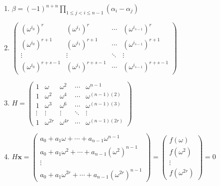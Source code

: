 \documentclass[oneside,10pt,]{article}
\newcommand{\lt}{<}
\begin{document}
\begin{enumerate}
\item{}\(\displaystyle \beta = (-1)^{n+n} \prod_{1 \leq j \lt i \leq n - 1} (\alpha_i - \alpha_j)\)%
\item{}\(\displaystyle \begin{pmatrix} (\omega^{i_0})^r & (\omega^{i_1})^r & \cdots & (\omega^{i_{s-1}})^r \\ (\omega^{i_0})^{r+1} & (\omega^{i_1})^{r+1} & \cdots & (\omega^{i_{s-1}})^{r+1} \\ \vdots & \vdots & \ddots & \vdots \\ (\omega^{i_0})^{r+s-1} & (\omega^{i_1})^{r+s-1} & \cdots & (\omega^{i_{s-1}})^{r+s-1} \end{pmatrix}\)%
\item{}\(\displaystyle H = \begin{pmatrix} 1 & \omega & \omega^2 & \cdots & \omega^{n-1}\\ 1 & \omega^2 & \omega^{4} & \cdots & \omega^{(n-1)(2)} \\ 1 & \omega^3 & \omega^{6} & \cdots & \omega^{(n-1)(3)} \\ \vdots & \vdots & \vdots & \ddots & \vdots \\ 1 & \omega^{2r} & \omega^{4r} & \cdots & \omega^{(n-1)(2r)} \end{pmatrix}\)%
\item{}\(\displaystyle H {\mathbf x} = \begin{pmatrix} a_0 + a_1 \omega + \cdots + a_{n-1} \omega^{n-1} \\ a_0 + a_1 \omega^2 + \cdots + a_{n-1} (\omega^2)^{n-1} \\ \vdots \\ a_0 + a_1 \omega^{2r} + \cdots + a_{n-1} (\omega^{2r})^{n-1} \end{pmatrix} = \begin{pmatrix} f(\omega) \\ f(\omega^2) \\ \vdots \\ f(\omega^{2r}) \end{pmatrix} = 0\)%
\end{enumerate}
%
\end{document}
